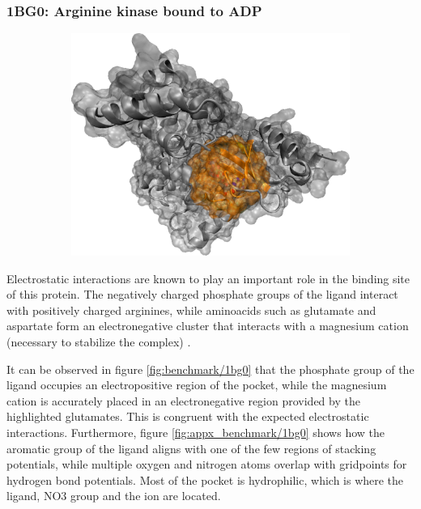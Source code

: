     \subsubsection{1BG0: Arginine kinase bound to ADP}
      \begin{figure}[H] \centering
        \begin{subfigure}[c]{0.3\textwidth} \centering
          \includegraphics[width=1\textwidth]{figures/results/ps_prot/1bg0.png}
        \end{subfigure}
        \begin{subfigure}[c]{0.3\textwidth} \centering
        \end{subfigure}
      \end{figure}

      Electrostatic interactions are known to play an important role in the binding site of this protein. The negatively charged phosphate groups of the ligand interact with positively charged arginines, while aminoacids such as glutamate and aspartate form an electronegative cluster that interacts with a magnesium cation (necessary to stabilize the complex) \cite{benchmark_negative_2000}.

      It can be observed in figure \ref{fig:benchmark/1bg0} that the phosphate group of the ligand occupies an electropositive region of the pocket, while the magnesium cation is accurately placed in an electronegative region provided by the highlighted glutamates. This is congruent with the expected electrostatic interactions. Furthermore, figure \ref{fig:appx_benchmark/1bg0} shows how the aromatic group of the ligand aligns with one of the few regions of stacking potentials, while multiple oxygen and nitrogen atoms overlap with gridpoints for hydrogen bond potentials. Most of the pocket is hydrophilic, which is where the ligand, NO3 group and the ion are located.

